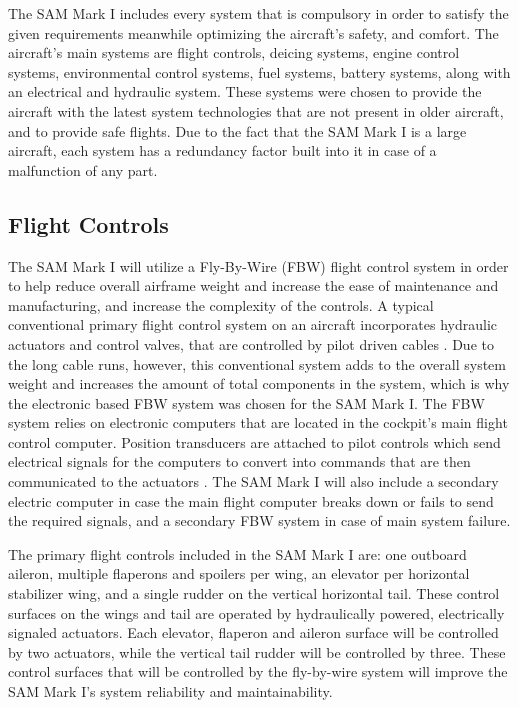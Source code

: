 The SAM Mark I includes every system that is compulsory in order to satisfy the given requirements meanwhile optimizing the aircraft's safety, and comfort. The aircraft's main systems are flight controls, deicing systems, engine control systems, environmental control systems, fuel systems, battery systems, along with an electrical and hydraulic system. These systems were chosen to provide the aircraft with the latest system technologies that are not present in older aircraft, and to provide safe flights. Due to the fact that the SAM Mark I is a large aircraft, each system has a redundancy factor built into it in case of a malfunction of any part. 

\subsection{Flight Controls}
The SAM Mark I will utilize a Fly-By-Wire (FBW) flight control system in order to help reduce overall airframe weight and increase the ease of maintenance and manufacturing, and increase the complexity of the controls. A typical conventional primary flight control system on an aircraft incorporates hydraulic actuators and control valves, that are controlled by pilot driven cables \cite{fbw}. Due to the long cable runs, however, this conventional system adds to the overall system weight and increases the amount of total components in the system, which is why the electronic based FBW system was chosen for the SAM Mark I. The FBW system relies on electronic computers that are located in the cockpit’s main flight control computer. Position transducers are attached to pilot controls which send electrical signals for the computers to convert into commands that are then communicated to the actuators \cite{fbw}. The SAM Mark I will also include a secondary electric computer in case the main flight computer breaks down or fails to send the required signals, and a secondary FBW system in case of main system failure.

The primary flight controls included in the SAM Mark I are: one outboard aileron, multiple flaperons and spoilers per wing, an elevator per horizontal stabilizer wing, and a single rudder on the vertical horizontal tail. These control surfaces on the wings and tail are operated by hydraulically powered, electrically signaled actuators. Each elevator, flaperon and aileron surface will be controlled by two actuators, while the vertical tail rudder will be controlled by three. These control surfaces that will be controlled by the fly-by-wire system will improve the SAM Mark I’s system reliability and maintainability.

